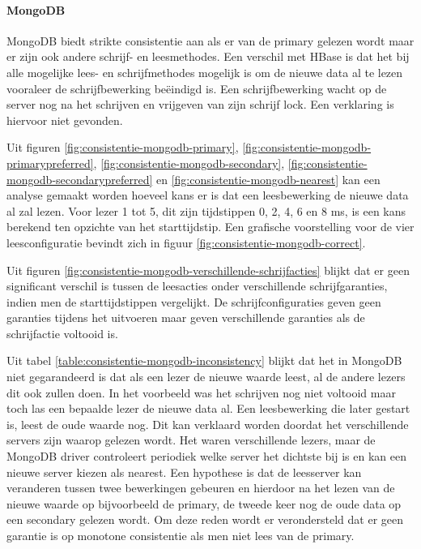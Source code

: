 \paragraph{MongoDB} MongoDB biedt strikte consistentie aan als er van de primary gelezen wordt maar er zijn ook andere schrijf- en leesmethodes. Een verschil met HBase is dat het bij alle mogelijke lees- en schrijfmethodes mogelijk is om de nieuwe data al te lezen vooraleer de schrijfbewerking beëindigd is. Een schrijfbewerking wacht op de server nog na het schrijven en vrijgeven van zijn schrijf lock. Een verklaring is hiervoor niet gevonden.

Uit figuren \ref{fig:consistentie-mongodb-primary}, \ref{fig:consistentie-mongodb-primarypreferred}, \ref{fig:consistentie-mongodb-secondary}, \ref{fig:consistentie-mongodb-secondarypreferred} en \ref{fig:consistentie-mongodb-nearest} kan een analyse gemaakt worden hoeveel kans er is dat een leesbewerking de nieuwe data al zal lezen. Voor lezer 1 tot 5, dit zijn tijdstippen 0, 2, 4, 6 en 8 ms, is een kans berekend ten opzichte van het starttijdstip. Een grafische voorstelling voor de vier leesconfiguratie bevindt zich in figuur \ref{fig:consistentie-mongodb-correct}. 

Uit figuren \ref{fig:consistentie-mongodb-verschillende-schrijfacties} blijkt dat er geen significant verschil is tussen de leesacties onder verschillende schrijfgaranties, indien men de starttijdstippen vergelijkt. De schrijfconfiguraties geven geen garanties tijdens het uitvoeren maar geven verschillende garanties als de schrijfactie voltooid is.

Uit tabel \ref{table:consistentie-mongodb-inconsistency} blijkt dat het in MongoDB niet gegarandeerd is dat als een lezer de nieuwe waarde leest, al de andere lezers dit ook zullen doen. In het voorbeeld was het schrijven nog niet voltooid maar toch las een bepaalde lezer de nieuwe data al. Een leesbewerking die later gestart is, leest de oude waarde nog. Dit kan verklaard worden doordat het verschillende servers zijn waarop gelezen wordt. Het waren verschillende lezers, maar de MongoDB driver controleert periodiek welke server het dichtste bij is en kan een nieuwe server kiezen als nearest. Een hypothese is dat de leesserver kan veranderen tussen twee bewerkingen gebeuren en hierdoor na het lezen van de nieuwe waarde op bijvoorbeeld de primary, de tweede keer nog de oude data op een secondary gelezen wordt. Om deze reden wordt er verondersteld dat er geen garantie is op monotone consistentie als men niet lees van de primary. 

